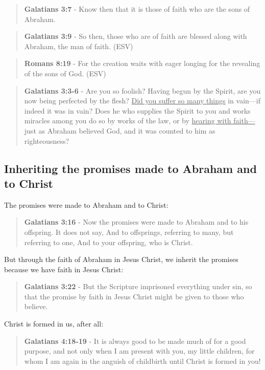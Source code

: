 \documentclass[11pt]{article}
\begin{document}
\begin{quote}
\textbf{Galatians 3:7} - Know then that it is those of faith who are the sons of Abraham.
\end{quote}

\begin{quote}
\textbf{Galatians 3:9} - So then, those who are of faith are blessed along with Abraham, the man of faith. (ESV)
\end{quote}

\begin{quote}
\textbf{Romans 8:19} - For the creation waits with eager longing for the revealing of the sons of God. (ESV)
\end{quote}

\begin{quote}
\textbf{Galatians 3:3-6} - Are you so foolish? Having begun by the Spirit, are you now being perfected by the flesh? \uline{Did you suffer so many things} in vain—if indeed it was in vain? Does he who supplies the Spirit to you and works miracles among you do so by works of the law, or by \uline{hearing with faith—} just as Abraham believed God, and it was counted to him as righteousness?
\end{quote}

\subsection{Inheriting the promises made to Abraham and to Christ}
\label{sec:org8144e21}

The promises were made to Abraham and to Christ:

\begin{quote}
\textbf{Galatians 3:16} - Now the promises were made to Abraham and to his offspring. It does not say, And to offsprings, referring to many, but referring to one, And to your offspring, who is Christ.
\end{quote}

But through the faith of Abraham in Jesus Christ, we inherit the promises because we have faith in Jesus Christ:

\begin{quote}
\textbf{Galatians 3:22} - But the Scripture imprisoned everything under sin, so that the promise by faith in Jesus Christ might be given to those who believe.
\end{quote}

Christ is formed in us, after all:

\begin{quote}
\textbf{Galatians 4:18-19} - It is always good to be made much of for a good purpose, and not only when I am present with you, my little children, for whom I am again in the anguish of childbirth until Christ is formed in you!
\end{quote}
\end{document}
